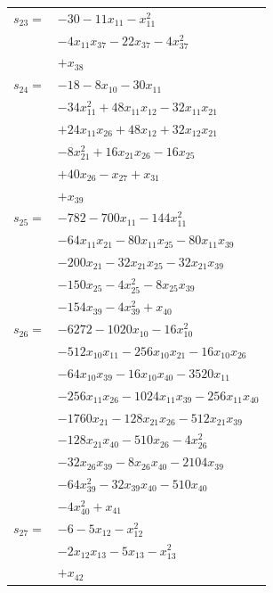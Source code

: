 \begin{longtable}{@{}r@{\;}l@{}}
\(s_{23}=\) & \(\displaystyle -30 -11x_{11} -x_{11}^{2}\) \\
 & \(\displaystyle -4x_{11}x_{37} -22x_{37} -4x_{37}^{2}\) \\
 & \(\displaystyle +x_{38}\) \\[3pt]
\(s_{24}=\) & \(\displaystyle -18 -8x_{10} -30x_{11}\) \\
 & \(\displaystyle -34x_{11}^{2} +48x_{11}x_{12} -32x_{11}x_{21}\) \\
 & \(\displaystyle +24x_{11}x_{26} +48x_{12} +32x_{12}x_{21}\) \\
 & \(\displaystyle -8x_{21}^{2} +16x_{21}x_{26} -16x_{25}\) \\
 & \(\displaystyle +40x_{26} -x_{27} +x_{31}\) \\
 & \(\displaystyle +x_{39}\) \\[3pt]
\(s_{25}=\) & \(\displaystyle -782 -700x_{11} -144x_{11}^{2}\) \\
 & \(\displaystyle -64x_{11}x_{21} -80x_{11}x_{25} -80x_{11}x_{39}\) \\
 & \(\displaystyle -200x_{21} -32x_{21}x_{25} -32x_{21}x_{39}\) \\
 & \(\displaystyle -150x_{25} -4x_{25}^{2} -8x_{25}x_{39}\) \\
 & \(\displaystyle -154x_{39} -4x_{39}^{2} +x_{40}\) \\[3pt]
\(s_{26}=\) & \(\displaystyle -6272 -1020x_{10} -16x_{10}^{2}\) \\
 & \(\displaystyle -512x_{10}x_{11} -256x_{10}x_{21} -16x_{10}x_{26}\) \\
 & \(\displaystyle -64x_{10}x_{39} -16x_{10}x_{40} -3520x_{11}\) \\
 & \(\displaystyle -256x_{11}x_{26} -1024x_{11}x_{39} -256x_{11}x_{40}\) \\
 & \(\displaystyle -1760x_{21} -128x_{21}x_{26} -512x_{21}x_{39}\) \\
 & \(\displaystyle -128x_{21}x_{40} -510x_{26} -4x_{26}^{2}\) \\
 & \(\displaystyle -32x_{26}x_{39} -8x_{26}x_{40} -2104x_{39}\) \\
 & \(\displaystyle -64x_{39}^{2} -32x_{39}x_{40} -510x_{40}\) \\
 & \(\displaystyle -4x_{40}^{2} +x_{41}\) \\[3pt]
\(s_{27}=\) & \(\displaystyle -6 -5x_{12} -x_{12}^{2}\) \\
 & \(\displaystyle -2x_{12}x_{13} -5x_{13} -x_{13}^{2}\) \\
 & \(\displaystyle +x_{42}\) \\[3pt]

\end{longtable}
